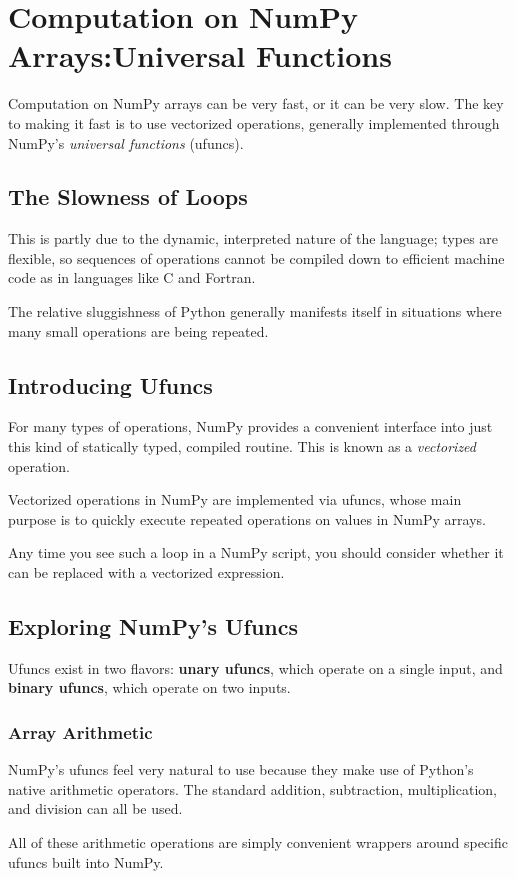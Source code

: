 \chapter{Computation on NumPy Arrays:Universal Functions\label{Ch06}}
Computation on NumPy arrays can be very fast, or it can be very slow. The key to
making it fast is to use vectorized operations, generally implemented through NumPy's \emph{universal functions} (ufuncs).
\section{The Slowness of Loops}
This is partly due to the dynamic, interpreted nature of the language; types are
flexible, so sequences of operations cannot be compiled down to efficient machine
code as in languages like C and Fortran.

The relative sluggishness of Python generally manifests itself in situations where
many small operations are being repeated.

\section{Introducing Ufuncs}
For many types of operations, NumPy provides a convenient interface into just this
kind of statically typed, compiled routine. This is known as a \emph{vectorized} operation.

Vectorized operations in NumPy are implemented via ufuncs, whose main purpose is
to quickly execute repeated operations on values in NumPy arrays.

Any time you see such a loop in a NumPy script, you should consider
whether it can be replaced with a vectorized expression.

\section{Exploring NumPy's Ufuncs}
Ufuncs exist in two flavors: \textbf{unary ufuncs}, which operate on a single input, and \textbf{binary
    ufuncs}, which operate on two inputs.

\subsection*{Array Arithmetic}
NumPy's ufuncs feel very natural to use because they make use of Python's native
arithmetic operators. The standard addition, subtraction, multiplication, and division
can all be used.

All of these arithmetic operations are simply convenient wrappers around specific
ufuncs built into NumPy.


